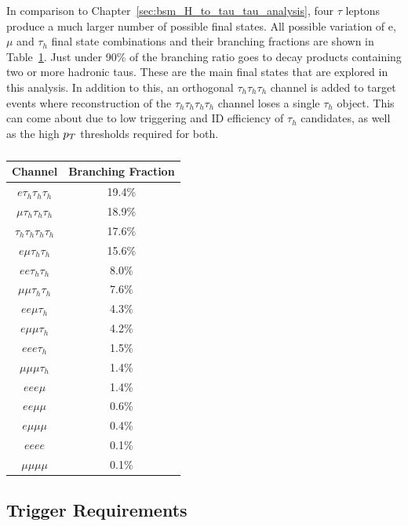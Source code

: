 In comparison to Chapter~\ref{sec:bsm_H_to_tau_tau_analysis}, four $\tau$ leptons produce a much larger number of possible final states. 
All possible variation of e, $\mu$ and $\tau_h$ final state combinations and their branching fractions are shown in Table~\ref{tab:4tau_bf}.
Just under 90\% of the branching ratio goes to decay products containing two or more hadronic taus.
These are the main final states that are explored in this analysis. 
In addition to this, an orthogonal $\tau_h \tau_h \tau_h$ channel is added to target events where reconstruction of the $\tau_h \tau_h \tau_h \tau_h$ channel loses a single $\tau_h$ object.
This can come about due to low triggering and ID efficiency of $\tau_h$ candidates, as well as the high $p_{T}$ thresholds required for both. \\

\begin{table}[H]
    \centering
    \begin{tabular}{|c|c|}
         \hline
         Channel & Branching Fraction  \\
         \hline
         \hline
         $e \tau_h \tau_h \tau_h$ & 19.4\% \\
         $\mu \tau_h \tau_h \tau_h$ & 18.9\% \\
         $\tau_h \tau_h \tau_h \tau_h$ & 17.6\% \\
         $e \mu \tau_h \tau_h$ & 15.6\% \\
         $e e \tau_h \tau_h$ & 8.0\% \\
         $\mu \mu \tau_h \tau_h$ & 7.6\% \\
         $e e \mu \tau_h$ & 4.3\% \\
         $e \mu \mu \tau_h$ & 4.2\% \\
         $e e e \tau_h$ & 1.5\% \\
         $\mu \mu \mu \tau_h$ & 1.4\% \\
         $e e e \mu$ & 1.4\% \\
         $e e \mu \mu$ & 0.6\% \\
         $e \mu \mu \mu$ & 0.4\% \\
         $e e e e$ & 0.1\% \\
         $\mu \mu \mu \mu$ & 0.1\% \\
         \hline
    \end{tabular}
    \caption{}
    \label{tab:4tau_bf} 
\end{table}

\subsection{Trigger Requirements}

